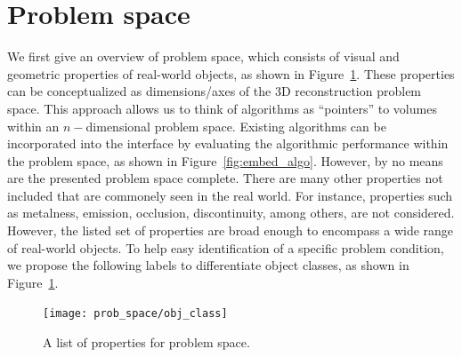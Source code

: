 \section{Problem space}
\label{sec:prob_space}
We first give an overview of problem space, which consists of visual and geometric properties of real-world objects, as shown in Figure~\ref{fig:obj_class}. These properties can be conceptualized as dimensions/axes of the 3D reconstruction problem space. This approach allows us to think of algorithms as ``pointers'' to volumes within an $n-$dimensional problem space. Existing algorithms can be incorporated into the interface by evaluating the algorithmic performance within the problem space, as shown in Figure~\ref{fig:embed_algo}. However, by no means are the presented problem space complete. There are many other properties not included that are commonely seen in the real world. For instance, properties such as metalness, emission, occlusion, discontinuity, among others, are not considered. However, the listed set of properties are broad enough to encompass a wide range of real-world objects. To help easy identification of a specific problem condition, we propose the following labels to differentiate object classes, as shown in Figure~\ref{fig:obj_class}.
\begin{figure}[!htbp]
\centering
\texttt{[image: prob\_space/obj\_class]}\\
\caption{A list of properties for problem space.}
\label{fig:obj_class}
\end{figure}

